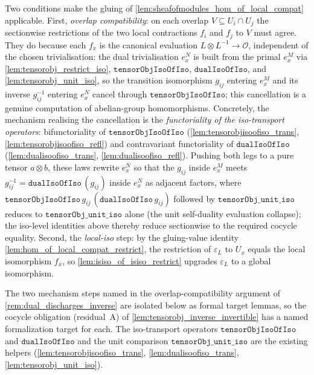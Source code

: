 \begin{remark}
  Two conditions make the gluing of \cref{lem:sheafofmodules_hom_of_local_compat} applicable.
  First, \emph{overlap compatibility}: on each overlap \(V \subseteq U_i \cap U_j\) the
  sectionwise restrictions of the two local contractions \(f_i\) and \(f_j\) to \(V\) must
  agree. They do because each \(f_x\) is the canonical evaluation
  \(L \otimes L^{-1} \to \mathcal{O}\), independent of the chosen trivialisation: the dual
  trivialisation \(e^N_x\) is built from the primal \(e^M_x\) via
  \cref{lem:tensorobj_restrict_iso}, \(\mathtt{tensorObjIsoOfIso}\), \(\mathtt{dualIsoOfIso}\),
  and \cref{lem:tensorobj_unit_iso}, so the transition isomorphism \(g_{ij}\) entering
  \(e^M_x\) and its inverse \(g_{ij}^{-1}\) entering \(e^N_x\) cancel through
  \(\mathtt{tensorObjIsoOfIso}\); this cancellation is a genuine computation of abelian-group
  homomorphisms. Concretely, the mechanism realising the cancellation is the
  \emph{functoriality of the iso-transport operators}: bifunctoriality of
  \(\mathtt{tensorObjIsoOfIso}\) (\cref{lem:tensorobjisoofiso_trans}, \cref{lem:tensorobjisoofiso_refl})
  and contravariant functoriality of \(\mathtt{dualIsoOfIso}\) (\cref{lem:dualisoofiso_trans},
  \cref{lem:dualisoofiso_refl}). Pushing both legs to a pure tensor \(a \otimes b\), these laws
  rewrite \(e^N_x\) so that the \(g_{ij}\) inside \(e^M_x\) meets \(g_{ij}^{-1} = \mathtt{dualIsoOfIso}\,
  (g_{ij})\) inside \(e^N_x\) as adjacent factors, where \(\mathtt{tensorObjIsoOfIso}\,g_{ij}\,
  (\mathtt{dualIsoOfIso}\,g_{ij})\) followed by \(\mathtt{tensorObj\_unit\_iso}\) reduces to
  \(\mathtt{tensorObj\_unit\_iso}\) alone (the unit self-duality evaluation collapse); the
  iso-level identities above thereby reduce sectionwise to the required cocycle equality.
  Second, the \emph{local-iso} step: by the gluing-value identity
  \cref{lem:hom_of_local_compat_restrict}, the restriction of \(\varepsilon_L\) to \(U_x\)
  equals the local isomorphism \(f_x\), so \cref{lem:isiso_of_isiso_restrict} upgrades
  \(\varepsilon_L\) to a global isomorphism.
\end{remark}

The two mechanism steps named in the overlap-compatibility argument of
\cref{rem:dual_discharges_inverse} are isolated below as formal target lemmas, so the
cocycle obligation (residual~A) of \cref{lem:tensorobj_inverse_invertible} has a named
formalization target for each. The iso-transport operators
\(\mathtt{tensorObjIsoOfIso}\) and \(\mathtt{dualIsoOfIso}\) and the unit comparison
\(\mathtt{tensorObj\_unit\_iso}\) are the existing helpers
(\cref{lem:tensorobjisoofiso_trans}, \cref{lem:dualisoofiso_trans},
\cref{lem:tensorobj_unit_iso}).

